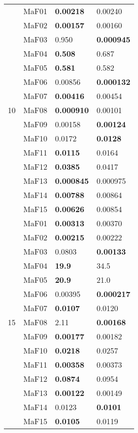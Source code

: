 \documentclass[]{article}
\begin{document}
\begin{table}
\begin{footnotesize}
\begin{tabular}{|l|l|l|l|}
\multirow{15}{*}{10} & MaF01 & \cellcolor{gray95} {\bf 0.00218} & 0.00240\\
 & MaF02 & \cellcolor{gray95} {\bf 0.00157} & 0.00160\\
 & MaF03 & 0.950 & \cellcolor{gray95} {\bf 0.000945}\\
 & MaF04 & \cellcolor{gray95} {\bf 0.508} & 0.687\\
 & MaF05 & \cellcolor{gray95} {\bf 0.581} & \cellcolor{gray95} 0.582\\
 & MaF06 & 0.00856 & \cellcolor{gray95} {\bf 0.000132}\\
 & MaF07 & \cellcolor{gray95} {\bf 0.00416} & 0.00454\\
 & MaF08 & \cellcolor{gray95} {\bf 0.000910} & 0.00101\\
 & MaF09 & 0.00158 & \cellcolor{gray95} {\bf 0.00124}\\
 & MaF10 & 0.0172 & \cellcolor{gray95} {\bf 0.0128}\\
 & MaF11 & \cellcolor{gray95} {\bf 0.0115} & 0.0164\\
 & MaF12 & \cellcolor{gray95} {\bf 0.0385} & 0.0417\\
 & MaF13 & \cellcolor{gray95} {\bf 0.000845} & 0.000975\\
 & MaF14 & \cellcolor{gray95} {\bf 0.00788} & \cellcolor{gray95} 0.00864\\
 & MaF15 & \cellcolor{gray95} {\bf 0.00626} & \cellcolor{gray95} 0.00854\\
\hline

\multirow{15}{*}{15} & MaF01 & \cellcolor{gray95} {\bf 0.00313} & 0.00370\\
 & MaF02 & \cellcolor{gray95} {\bf 0.00215} & 0.00222\\
 & MaF03 & 0.0803 & \cellcolor{gray95} {\bf 0.00133}\\
 & MaF04 & \cellcolor{gray95} {\bf 19.9} & 34.5\\
 & MaF05 & \cellcolor{gray95} {\bf 20.9} & \cellcolor{gray95} 21.0\\
 & MaF06 & 0.00395 & \cellcolor{gray95} {\bf 0.000217}\\
 & MaF07 & \cellcolor{gray95} {\bf 0.0107} & 0.0120\\
 & MaF08 & 2.11 & \cellcolor{gray95} {\bf 0.00168}\\
 & MaF09 & \cellcolor{gray95} {\bf 0.00177} & \cellcolor{gray95} 0.00182\\
 & MaF10 & \cellcolor{gray95} {\bf 0.0218} & 0.0257\\
 & MaF11 & \cellcolor{gray95} {\bf 0.00358} & \cellcolor{gray95} 0.00373\\
 & MaF12 & \cellcolor{gray95} {\bf 0.0874} & 0.0954\\
 & MaF13 & \cellcolor{gray95} {\bf 0.00122} & 0.00149\\
 & MaF14 & 0.0123 & \cellcolor{gray95} {\bf 0.0101}\\
 & MaF15 & \cellcolor{gray95} {\bf 0.0105} & 0.0119\\
\hline
\end{tabular}
\end{footnotesize}
\end{table}
\end{document}

